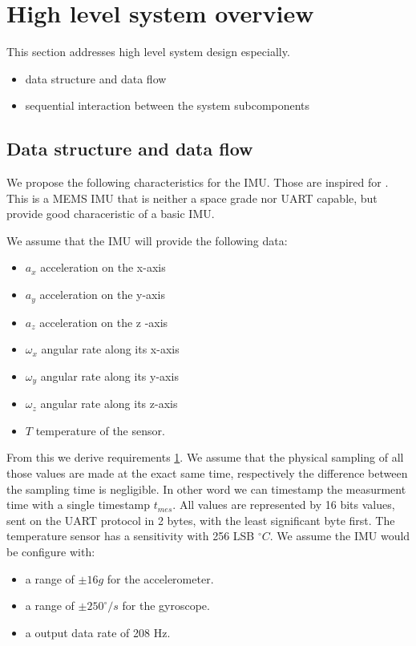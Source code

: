 \section{High level system overview}
This section addresses high level system design especially.
\begin{itemize}
    \item data structure and data flow
    \item sequential interaction between the system subcomponents
\end{itemize}

\subsection{Data structure and data flow}
We propose the following characteristics for the IMU. Those are inspired for \cite{lm6ds3}. This is a MEMS IMU that is neither a space grade nor UART capable, but provide good characeristic of a basic IMU.

We assume that the IMU will provide the following data:
\begin{itemize}
    \item $a_x$ acceleration on the x-axis
    \item $a_y$ acceleration on the y-axis
    \item $a_z$ acceleration on the z -axis
    \item $\omega_x$ angular rate along its x-axis
    \item $\omega_y$ angular rate along its y-axis
    \item $\omega_z$ angular rate along its z-axis
    \item $T$ temperature of the sensor.
\end{itemize}
From this we derive requirements \hyperref[req-1]{1}.
We assume that the physical sampling of all those values are made at the exact same time, respectively the difference between the sampling time is negligible.
In other word we can timestamp the measurment time with a single timestamp $t_{mes}$.
All values are represented by 16 bits values, sent on the UART protocol in 2 bytes, with the least significant byte first.
The temperature sensor has a sensitivity with 256 LSB $^{\circ}C$.
We assume the IMU would be configure with:
\begin{itemize}
    \item a range of $\pm 16g$ for the accelerometer.
    \item a range of $\pm 250^{\circ}/s$ for the gyroscope.
    \item a output data rate of 208 Hz.
\end{itemize}

